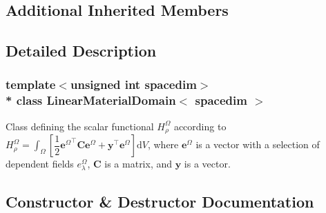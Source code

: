 \subsection*{Additional Inherited Members}


\subsection{Detailed Description}
\subsubsection*{template$<$unsigned int spacedim$>$\\*
class Linear\+Material\+Domain$<$ spacedim $>$}

Class defining the scalar functional $H^\Omega_\rho$ according to $H^\Omega_\rho=\int_\Omega \left[ \dfrac{1}{2} {\boldsymbol{e}^\Omega}^\top \boldsymbol{C} {\boldsymbol{e}^\Omega} + \boldsymbol{y}^\top \boldsymbol{e}^\Omega \right] \mathrm{d}V$, where $\boldsymbol{e}^\Omega$ is a vector with a selection of dependent fields $e^\Omega_\lambda$, $\boldsymbol{C}$ is a matrix, and $\boldsymbol{y}$ is a vector. 

\subsection{Constructor \& Destructor Documentation}
